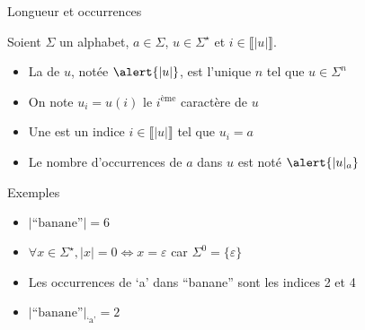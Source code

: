 
\begingroup

\begin{frame}{Longueur et occurrences}
  
  Soient $\Sigma$ un alphabet, $a\in\Sigma$, $u\in \Sigma^\star$ et $i\in \llbracket |u|\rrbracket$.
  \begin{itemize}
  \item La  de $u$, notée $\alert{|u|}$, est l'unique $n$ tel que $u\in \Sigma^n$
  \item On note \alert{$u_i = u(i)$} le $i^\text{ème}$ caractère de $u$
  \item Une  est un indice $i\in \llbracket |u|\rrbracket$ tel que $u_i = a$
  \item Le nombre d'occurrences de $a$ dans $u$ est noté $\alert{|u|_a}$
  \end{itemize}

  \begin{exampleblock}{Exemples}
    \begin{itemize}
    \item $|\text{``banane''}| = 6$
    \item $\forall x\in \Sigma^\star, |x| = 0 \Leftrightarrow x = \varepsilon$ car $\Sigma^0 = \{\varepsilon\}$
    \item Les occurrences de `a' dans ``banane'' sont les indices 2 et 4
    \item $|\text{``banane''}|_{\text{`a'}} = 2$
    \end{itemize}
  \end{exampleblock}

\end{frame}

\endgroup
